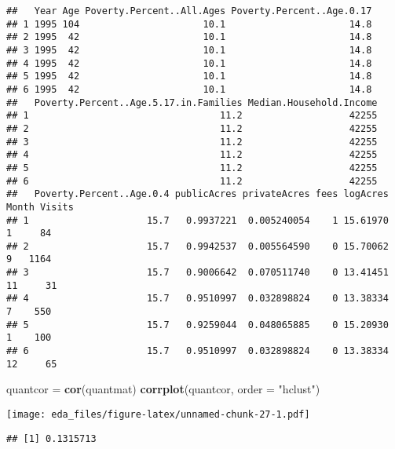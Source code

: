\documentclass[
]{article}
\newenvironment{Shaded}{\begin{snugshade}}{\end{snugshade}}
\newcommand{\DataTypeTok}[1]{\textcolor[rgb]{0.13,0.29,0.53}{#1}}
\newcommand{\FloatTok}[1]{\textcolor[rgb]{0.00,0.00,0.81}{#1}}
\newcommand{\KeywordTok}[1]{\textcolor[rgb]{0.13,0.29,0.53}{\textbf{#1}}}
\newcommand{\NormalTok}[1]{#1}
\newcommand{\OperatorTok}[1]{\textcolor[rgb]{0.81,0.36,0.00}{\textbf{#1}}}
\newcommand{\StringTok}[1]{\textcolor[rgb]{0.31,0.60,0.02}{#1}}
\begin{document}
\begin{verbatim}
##   Year Age Poverty.Percent..All.Ages Poverty.Percent..Age.0.17
## 1 1995 104                      10.1                      14.8
## 2 1995  42                      10.1                      14.8
## 3 1995  42                      10.1                      14.8
## 4 1995  42                      10.1                      14.8
## 5 1995  42                      10.1                      14.8
## 6 1995  42                      10.1                      14.8
##   Poverty.Percent..Age.5.17.in.Families Median.Household.Income
## 1                                  11.2                   42255
## 2                                  11.2                   42255
## 3                                  11.2                   42255
## 4                                  11.2                   42255
## 5                                  11.2                   42255
## 6                                  11.2                   42255
##   Poverty.Percent..Age.0.4 publicAcres privateAcres fees logAcres Month Visits
## 1                     15.7   0.9937221  0.005240054    1 15.61970     1     84
## 2                     15.7   0.9942537  0.005564590    0 15.70062     9   1164
## 3                     15.7   0.9006642  0.070511740    0 13.41451    11     31
## 4                     15.7   0.9510997  0.032898824    0 13.38334     7    550
## 5                     15.7   0.9259044  0.048065885    0 15.20930     1    100
## 6                     15.7   0.9510997  0.032898824    0 13.38334    12     65
\end{verbatim}

\begin{Shaded}
\begin{Highlighting}[]
\NormalTok{quantcor =}\StringTok{ }\KeywordTok{cor}\NormalTok{(quantmat)}
\KeywordTok{corrplot}\NormalTok{(quantcor, }\DataTypeTok{order =} \StringTok{"hclust"}\NormalTok{)}
\end{Highlighting}
\end{Shaded}

\texttt{[image: eda\_files/figure-latex/unnamed-chunk-27-1.pdf]}

\begin{Shaded}
\end{Shaded}

\begin{verbatim}
## [1] 0.1315713
\end{verbatim}
\end{document}
